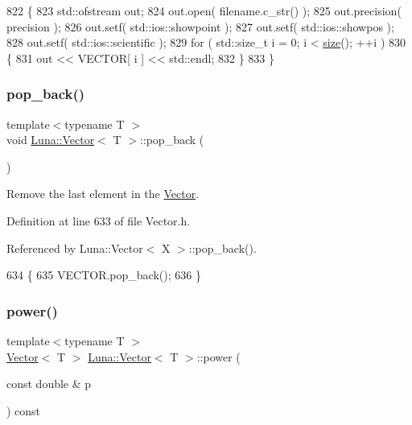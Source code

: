\begin{DoxyCode}
822   \{
823     std::ofstream out;
824     out.open( filename.c\_str() );
825     out.precision( precision );
826     out.setf( std::ios::showpoint );
827     out.setf( std::ios::showpos );
828     out.setf( std::ios::scientific );
829     \textcolor{keywordflow}{for} ( std::size\_t i = 0; i < \hyperlink{classLuna_1_1Vector_ac9b6ed7a0df401728f27c193fbc8f4d8}{size}(); ++i )
830     \{
831       out << VECTOR[ i ] << std::endl;
832     \}
833   \}
\end{DoxyCode}
\mbox{\label{classLuna_1_1Vector_afd5c648a6a46b09e75ba94f8e7bc65ba}} 
\subsubsection{\texorpdfstring{pop\+\_\+back()}{pop\_back()}}
{\footnotesize\ttfamily template$<$typename T $>$ \\
void \hyperlink{classLuna_1_1Vector}{Luna\+::\+Vector}$<$ T $>$\+::pop\+\_\+back (\begin{DoxyParamCaption}{ }\end{DoxyParamCaption})\hspace{0.3cm}{\ttfamily [inline]}}



Remove the last element in the \hyperlink{classLuna_1_1Vector}{Vector}. 



Definition at line 633 of file Vector.\+h.



Referenced by Luna\+::\+Vector$<$ X $>$\+::pop\+\_\+back().


\begin{DoxyCode}
634   \{
635     VECTOR.pop\_back();
636   \}
\end{DoxyCode}
\mbox{\label{classLuna_1_1Vector_ad691f671733f78bbf3bdbaf46fcbc5a0}} 
\subsubsection{\texorpdfstring{power()}{power()}}
{\footnotesize\ttfamily template$<$typename T $>$ \\
\hyperlink{classLuna_1_1Vector}{Vector}$<$ T $>$ \hyperlink{classLuna_1_1Vector}{Luna\+::\+Vector}$<$ T $>$\+::power (\begin{DoxyParamCaption}\item[{const double \&}]{p }\end{DoxyParamCaption}) const\hspace{0.3cm}{\ttfamily [inline]}}



